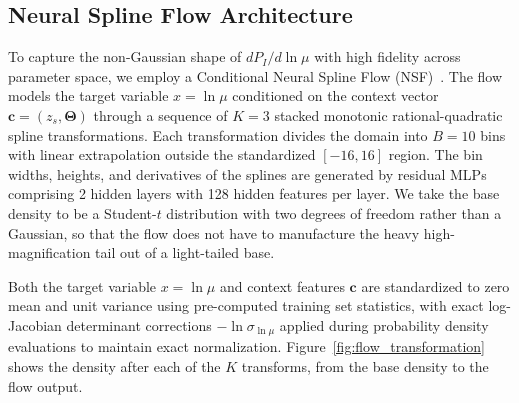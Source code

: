 \documentclass[aps,prd,10pt,nofootinbib,twocolumn,superscriptaddress,floatfix,notitlepage]{revtex4-1}
\newcommand{\vect}[1]{\boldsymbol{#1}}
\newcommand{\B}[1]{{\color{blue} #1}}
\begin{document}
\subsection{\B{Neural Spline Flow Architecture}}

\B{To capture the non-Gaussian shape of $dP_I/d\ln\mu$ with high fidelity across parameter space, we employ a Conditional Neural Spline Flow (NSF)~\cite{Durkan:2019nsq}. The flow models the target variable $x = \ln\mu$ conditioned on the context vector $\vect{c} = (z_s, \vect\Theta)$ through a sequence of $K = 3$ stacked monotonic rational-quadratic spline transformations. Each transformation divides the domain into $B = 10$ bins with linear extrapolation outside the standardized $[-16, 16]$ region. The bin widths, heights, and derivatives of the splines are generated by residual MLPs comprising 2 hidden layers with 128 hidden features per layer. We take the base density to be a Student-$t$ distribution with two degrees of freedom rather than a Gaussian, so that the flow does not have to manufacture the heavy high-magnification tail out of a light-tailed base.

Both the target variable $x = \ln\mu$ and context features $\vect{c}$ are standardized to zero mean and unit variance using pre-computed training set statistics, with exact log-Jacobian determinant corrections $-\ln\sigma_{\ln\mu}$ applied during probability density evaluations to maintain exact normalization. Figure~\ref{fig:flow_transformation} shows the density after each of the $K$ transforms, from the base density to the flow output.}
\end{document}

